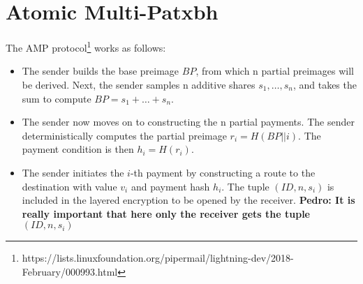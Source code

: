 \section{Atomic Multi-Patxbh}

The AMP protocol\footnote{https://lists.linuxfoundation.org/pipermail/lightning-dev/2018-February/000993.html} works as follows:

\begin{itemize}
	\item The sender builds the base preimage $\textit{BP}$, from which n 
	partial preimages will be derived. Next, the sender samples n additive shares $s_1,\ldots, s_n$, and takes the sum to compute 
	$\textit{BP} = s_1 + \ldots + s_n$.
	
	\item The sender now moves on to constructing the
n partial payments. The sender deterministically
computes the partial preimage $r_i = H(\textit{BP} ||  i)$. The payment 
condition is then $h_i = H(r_i)$. 

	\item The sender initiates the $i$-th payment by
constructing a route to the destination with 
value $v_i$ and payment hash $h_i$.
The tuple $(\textit{ID}, n, s_i)$ is included in the layered encryption 
to be opened by the receiver. {\bf Pedro: It is really important 
that here only the receiver gets the tuple $(\textit{ID}, n, s_i)$}
\end{itemize}

